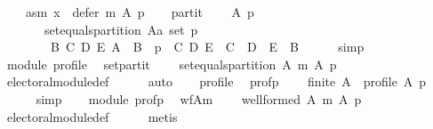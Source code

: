 \begin{isabellebody}
\ \ \ \ asm{}{\isacharcolon}{\kern0pt}\ {\isachardoublequoteopen}x\ {\isasymin}\ defer\ m\ A\ p{\isachardoublequoteclose}\isanewline
\ \ \isamarkupfalse%
\ partit{\isacharcolon}{\kern0pt}\isanewline
\ \ \ \ {\isachardoublequoteopen}{\isasymforall}A\ p{\isachardot}{\kern0pt}\isanewline
\ \ \ \ \ \ {\isasymnot}\ set{\isacharunderscore}{\kern0pt}equals{\isacharunderscore}{\kern0pt}partition\ {\isacharparenleft}{\kern0pt}A{\isacharcolon}{\kern0pt}{\isacharcolon}{\kern0pt}{\isacharprime}{\kern0pt}a\ set{\isacharparenright}{\kern0pt}\ p\ {\isasymor}\isanewline
\ \ \ \ \ \ \ \ {\isacharparenleft}{\kern0pt}{\isasymexists}B\ C\ D\ E{\isachardot}{\kern0pt}\ A\ {\isacharequal}{\kern0pt}\ B\ {\isasymand}\ p\ {\isacharequal}{\kern0pt}\ {\isacharparenleft}{\kern0pt}C{\isacharcomma}{\kern0pt}\ D{\isacharcomma}{\kern0pt}\ E{\isacharparenright}{\kern0pt}\ {\isasymand}\ C\ {\isasymunion}\ D\ {\isasymunion}\ E\ {\isacharequal}{\kern0pt}\ B{\isacharparenright}{\kern0pt}{\isachardoublequoteclose}\isanewline
\ \ \ \ \isamarkupfalse%
\ simp\isanewline
\ \ \isamarkupfalse%
\ module\ profile\ \isamarkupfalse%
\ set{\isacharunderscore}{\kern0pt}partit{\isacharcolon}{\kern0pt}\isanewline
\ \ \ \ {\isachardoublequoteopen}set{\isacharunderscore}{\kern0pt}equals{\isacharunderscore}{\kern0pt}partition\ A\ {\isacharparenleft}{\kern0pt}m\ A\ p{\isacharparenright}{\kern0pt}{\isachardoublequoteclose}\isanewline
\ \ \ \ \isamarkupfalse%
\ electoral{\isacharunderscore}{\kern0pt}module{\isacharunderscore}{\kern0pt}def\isanewline
\ \ \ \ \isamarkupfalse%
\ auto\isanewline
\ \ \isamarkupfalse%
\ profile\ \isamarkupfalse%
\ prof{\isacharunderscore}{\kern0pt}p{\isacharcolon}{\kern0pt}\isanewline
\ \ \ \ {\isachardoublequoteopen}finite\ A\ {\isasymand}\ profile\ A\ p{\isachardoublequoteclose}\isanewline
\ \ \ \ \isamarkupfalse%
\ simp\isanewline
\ \ \isamarkupfalse%
\ module\ prof{\isacharunderscore}{\kern0pt}p\ \isamarkupfalse%
\ wf{\isacharunderscore}{\kern0pt}A{\isacharunderscore}{\kern0pt}m{\isacharcolon}{\kern0pt}\isanewline
\ \ \ \ {\isachardoublequoteopen}well{\isacharunderscore}{\kern0pt}formed\ A\ {\isacharparenleft}{\kern0pt}m\ A\ p{\isacharparenright}{\kern0pt}{\isachardoublequoteclose}\isanewline
\ \ \ \ \isamarkupfalse%
\ electoral{\isacharunderscore}{\kern0pt}module{\isacharunderscore}{\kern0pt}def\isanewline
\ \ \ \ \isamarkupfalse%
\ metis\isanewline
\ \ \isamarkupfalse%

\end{isabellebody}
